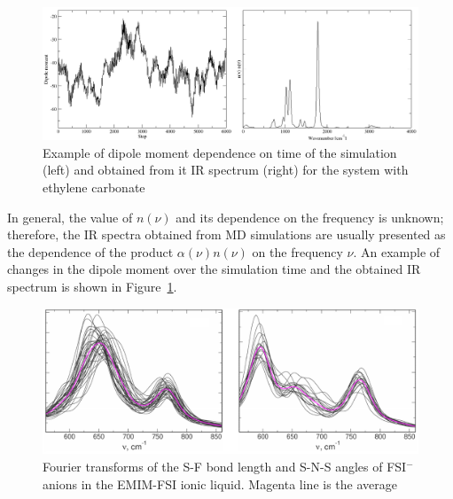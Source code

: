 \begin{figure}[ht]
    \centering
    \includegraphics[width=1.0\textwidth]{img/2-theoretical-methods/spectrum-example.png}
    \caption{Example of dipole moment dependence on time of the simulation (left) and obtained from it IR spectrum (right) for the system with ethylene carbonate}
    \label{fig:theoretical-methods-spectrum-example}
\end{figure}

In general, the value of $n(\nu)$ and its dependence on the frequency is unknown; therefore, the IR spectra obtained from MD simulations are usually presented as the dependence of the product $\alpha(\nu) n(\nu)$ on the frequency $\nu$. An example of changes in the dipole moment over the simulation time and the obtained IR spectrum is shown in Figure~\ref{fig:theoretical-methods-spectrum-example}.

\begin{figure}[ht]
    \centering
    \includegraphics[width=1.00\textwidth]{img/2-theoretical-methods/ft-example.png}
    \caption{Fourier transforms of the S-F bond length and S-N-S angles of FSI$^{-}$ anions in the EMIM-FSI ionic liquid. Magenta line is the average~\cite{emim-fsi}}
    \label{fig:theoretical-methods-ft-example}
\end{figure}

